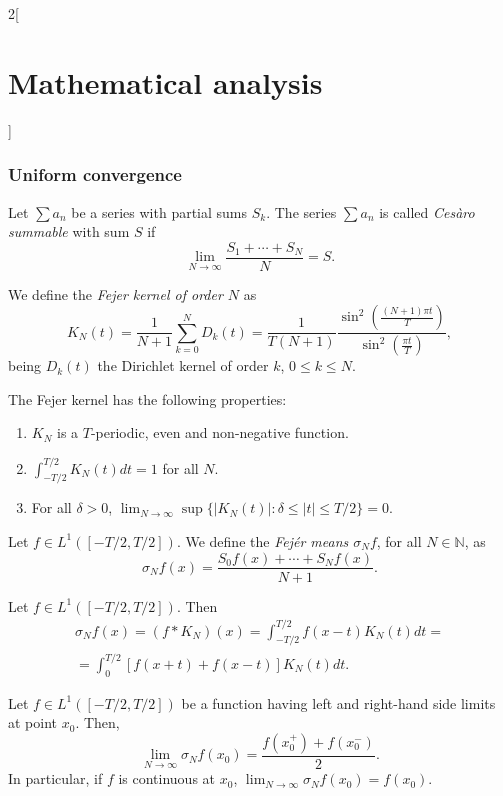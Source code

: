 \documentclass[class=article,crop=false]{standalone}
\begin{document}
\begin{multicols}{2}[\section{Mathematical analysis}]
\subsubsection{Uniform convergence}
\begin{definition}
Let $\sum a_n$ be a series with partial sums $S_k$. The series $\sum a_n$ is called \textit{Cesàro summable} with sum $S$ if $$\lim_{N\to\infty}\frac{S_1+\cdots+S_N}{N}=S.$$
\end{definition}
\begin{definition}
We define the \textit{Fejer kernel of order $N$} as $$K_N(t)=\frac{1}{N+1}\sum_{k=0}^ND_k(t)=\frac{1}{T(N+1)}\frac{\sin^2\left(\frac{(N+1)\pi t}{T}\right)}{\sin^2\left(\frac{\pi t}{T}\right)},$$ being $D_k(t)$ the Dirichlet kernel of order $k$, $0\leq k\leq N$.
\end{definition}
\begin{prop}
The Fejer kernel has the following properties:
\begin{enumerate}
    \item $K_N$ is a $T$-periodic, even and non-negative function.
    \item $\displaystyle\int_{-T/2}^{T/2}K_N(t)dt=1$ for all $N$.
    \item For all $\delta>0$, $\displaystyle\lim_{N\to\infty}\sup\{|K_N(t)|:\delta\leq|t|\leq T/2\}=0$.
\end{enumerate}
\end{prop}
\begin{definition}
Let $f\in L^1([-T/2,T/2])$. We define the \textit{Fejér means $\sigma_Nf$}, for all $N\in\mathbb{N}$, as $$\sigma_Nf(x)=\frac{S_0f(x)+\cdots+S_Nf(x)}{N+1}.$$
\end{definition}
\begin{prop}
Let $f\in L^1([-T/2,T/2])$. Then \begin{multline*}\sigma_Nf(x)=(f*K_N)(x)=\int_{-T/2}^{T/2}f(x-t)K_N(t)dt=\\=\int_0^{T/2}[f(x+t)+f(x-t)]K_N(t)dt.\end{multline*}
\end{prop}
\begin{theorem}
Let $f\in L^1([-T/2,T/2])$ be a function having left and right-hand side limits at point $x_0$. Then, $$\lim_{N\to\infty}\sigma_Nf(x_0)=\frac{f(x_0^+)+f(x_0^-)}{2}.$$ In particular, if $f$ is continuous at $x_0$, $\displaystyle\lim_{N\to\infty}\sigma_Nf(x_0)=f(x_0).$
\end{theorem}
\begin{theorem}

\end{theorem}
\end{multicols}
\end{document}
